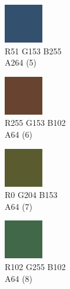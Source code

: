 \begin{figure}[!h]
\begin{subfigure}{0.105\textwidth}
	\end{subfigure}
	\begin{subfigure}{0.105\textwidth}\centering
		\includegraphics[frame]{gui-imgs/R51G153B255A64}
		\vspace*{-20px} \caption*{\hspace*{-0.25px}\tiny R51 G153 B255 \\ \tiny A264 (5)}
	\end{subfigure}
	\begin{subfigure}{0.105\textwidth}\centering
		\includegraphics[frame]{gui-imgs/R255G02B0A64}
		\vspace*{-20px} \caption*{\hspace*{-0.25px}\tiny R255 G153 B102 \\ \tiny A64 (6)}
	\end{subfigure}
	\begin{subfigure}{0.105\textwidth}\centering
		\includegraphics[frame]{gui-imgs/R204G204B0A64}
		\vspace*{-20px} \caption*{\hspace*{-0.25px}\tiny R0 G204 B153 \\ \tiny A64 (7)}
	\end{subfigure}
	\begin{subfigure}{0.105\textwidth}\centering
		\includegraphics[frame]{gui-imgs/R102G255B102A64}
		\vspace*{-20px} \caption*{\hspace*{-0.25px}\tiny R102 G255 B102 \\ \tiny A64 (8)}
	\end{subfigure}
	\begin{subfigure}{0.105\textwidth}\centering

\end{subfigure}
\end{figure}
